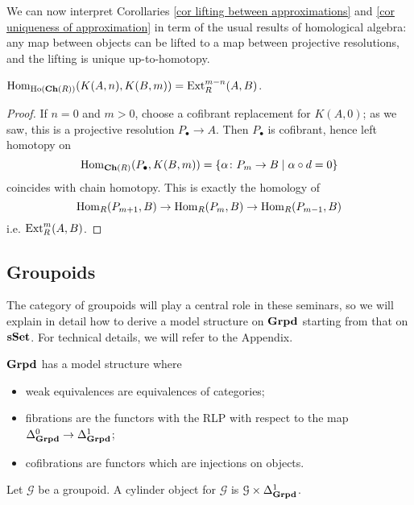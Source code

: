 \begin{refsection}
\begin{rmk}
We can now interpret Corollaries \ref{cor lifting between approximations} and \ref{cor uniqueness of approximation} in term of the usual results of homological algebra: any map between objects can be lifted to a map between projective resolutions, and the lifting is unique up-to-homotopy.
\end{rmk}

\begin{prop}
$\mathrm{Hom}_{\mathrm{Ho}(\mathbf{Ch}(R))}(K(A,n),K(B,m)) = \mathrm{Ext}_R^{m-n}(A,B)$.
\end{prop}

\begin{proof}
If $n = 0$ and $m > 0$, choose a cofibrant replacement for $K(A,0)$; as we saw, this is a projective resolution $P_\bullet \to A$. Then $P_\bullet$ is cofibrant, hence left homotopy on
\[
\mathrm{Hom}_{\mathbf{Ch}(R)}(P_\bullet, K(B,m)) = \{\alpha \colon P_m \to B \mid \alpha \circ d = 0 \}
\]
coincides with chain homotopy. This is exactly the homology of
\[
\mathrm{Hom}_R(P_{m+1},B) \to \mathrm{Hom}_R(P_m,B) \to \mathrm{Hom}_R(P_{m-1},B)
\]
i.e. $\mathrm{Ext}^m_R(A,B)$.
\end{proof}

\subsection{Groupoids} \label{model structure on groupoids}

The category of groupoids will play a central role in these seminars, so we will explain in detail how to derive a model structure on $\mathbf{Grpd}$ starting from that on $\mathbf{sSet}$. For technical details, we will refer to the Appendix.

\begin{thm} \label{thm model structure on groupoids}
$\mathbf{Grpd}$ has a model structure where
\begin{itemize}
\item weak equivalences are equivalences of categories;
\item fibrations are the functors with the RLP with respect to the map $\Delta^0_{\mathbf{Grpd}} \to \Delta^1_{\mathbf{Grpd}}$;
\item cofibrations are functors which are injections on objects.
\end{itemize}
\end{thm} %

\begin{prop} \label{prop cylinder for groupoids}
Let $\mathcal G$ be a groupoid. A cylinder object for $\mathcal G$ is $\mathcal G \times \Delta^1_{\mathbf{Grpd}}$.
\end{prop}


\end{refsection}
